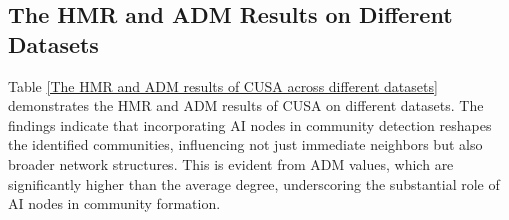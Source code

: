 \subsection{The HMR and ADM Results on Different Datasets} 
\label{HMR and ADM Results on Different Datasets}
Table \ref{The HMR and ADM results of CUSA across different datasets} demonstrates the HMR and ADM results of CUSA on different datasets. The findings indicate that incorporating AI nodes in community detection reshapes the identified communities, influencing not just immediate neighbors but also broader network structures. This is evident from ADM values, which are significantly higher than the average degree, underscoring the substantial role of AI nodes in community formation.


